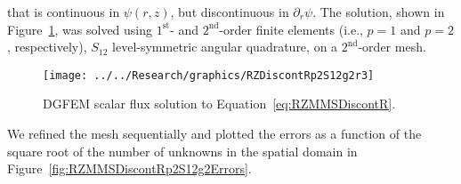 \documentclass[12pt,letterpaper]{article}
\begin{document}
\noindent that is continuous in $\psi(r,z)$, but discontinuous in $\partial_r \psi$. The solution, shown in Figure~\ref{fig:RZMMSDiscontRp2S12g2r3}, was solved using $1^\text{st}$- and $2^\text{nd}$-order finite elements (i.e., $p=1$ and $p=2$, respectively), $S_{12}$ level-symmetric angular quadrature, on a $2^\text{nd}$-order mesh.
%
\begin{figure}[!htb]
\centering
\texttt{[image: ../../Research/graphics/RZDiscontRp2S12g2r3]}
\caption{DGFEM scalar flux solution to Equation~\ref{eq:RZMMSDiscontR}.}
\label{fig:RZMMSDiscontRp2S12g2r3}
\end{figure}
%
We refined the mesh sequentially and plotted the errors as a function of the square root of the number of unknowns in the spatial domain in Figure~\ref{fig:RZMMSDiscontRp2S12g2Errors}.
%
\end{document}
